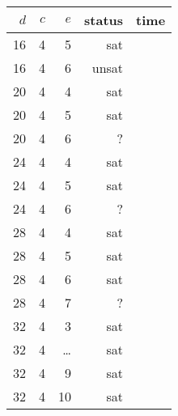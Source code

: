 ~~
\begin{tabular}{rrrrr}
$d$ & $c$ & $e$ & status & time \\
\midrule
16 & 4 &  5 &   sat &  \\
16 & 4 &  6 & unsat &  \\ %
20 & 4 &  4 &   sat &  \\
20 & 4 &  5 &   sat &  \\
20 & 4 &  6 &     ? &  \\
24 & 4 &  4 &   sat &  \\
24 & 4 &  5 &   sat &  \\
24 & 4 &  6 &     ? &  \\
28 & 4 &  4 &   sat &  \\
28 & 4 &  5 &   sat &  \\
28 & 4 &  6 &   sat &  \\
28 & 4 &  7 &     ? &  \\
32 & 4 &  3 &   sat &  \\
32 & 4 & \dots& sat &  \\
32 & 4 &  9 &   sat &  \\
32 & 4 & 10 &   sat &  
\end{tabular}
